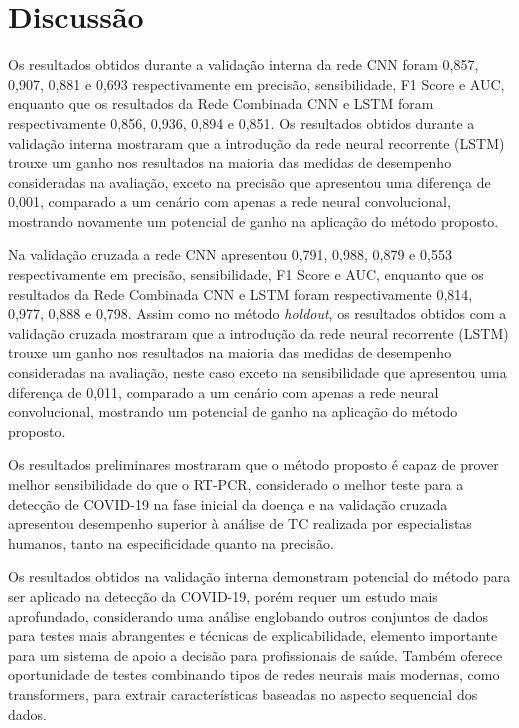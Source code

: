 \section{Discussão}\label{sec:cap_resultados_discussao}

Os resultados obtidos durante a validação interna da rede CNN foram 0,857, 0,907, 0,881 e 0,693 respectivamente em precisão, sensibilidade, F1 Score e AUC, enquanto que os resultados da Rede Combinada CNN e LSTM foram respectivamente 0,856, 0,936, 0,894 e 0,851. Os resultados obtidos durante a validação interna mostraram que a introdução da rede neural recorrente (LSTM) trouxe um ganho nos resultados na maioria das medidas de desempenho consideradas na avaliação, exceto na precisão que apresentou uma diferença de 0,001, comparado a um cenário com apenas a rede neural convolucional, mostrando novamente um potencial de ganho na aplicação do método proposto. 

Na validação cruzada a rede CNN apresentou 0,791, 0,988, 0,879 e 0,553 respectivamente em precisão, sensibilidade, F1 Score e AUC, enquanto que os resultados da Rede Combinada CNN e LSTM foram respectivamente 0,814, 0,977, 0,888 e 0,798.  Assim como no método \textit{holdout}, os resultados obtidos com a validação cruzada mostraram que a introdução da rede neural recorrente (LSTM) trouxe um ganho nos resultados na maioria das medidas de desempenho consideradas na avaliação, neste caso exceto na sensibilidade que apresentou uma diferença de 0,011, comparado a um cenário com apenas a rede neural convolucional, mostrando um potencial de ganho na aplicação do método proposto. 

Os resultados preliminares mostraram que o método proposto é capaz de prover melhor sensibilidade do que o RT-PCR, considerado o melhor teste para a detecção de COVID-19 na fase inicial da doença e na validação cruzada apresentou desempenho superior à análise de TC realizada por especialistas humanos, tanto na especificidade quanto na precisão. 

Os resultados obtidos na validação interna demonstram potencial do método para ser aplicado na detecção da COVID-19, porém requer um estudo mais aprofundado, considerando uma análise englobando outros conjuntos de dados para testes mais abrangentes e técnicas de explicabilidade, elemento importante para um sistema de apoio a decisão para profissionais de saúde. Também oferece oportunidade de testes combinando tipos de redes neurais mais modernas, como transformers, para extrair características baseadas no aspecto sequencial dos dados.
